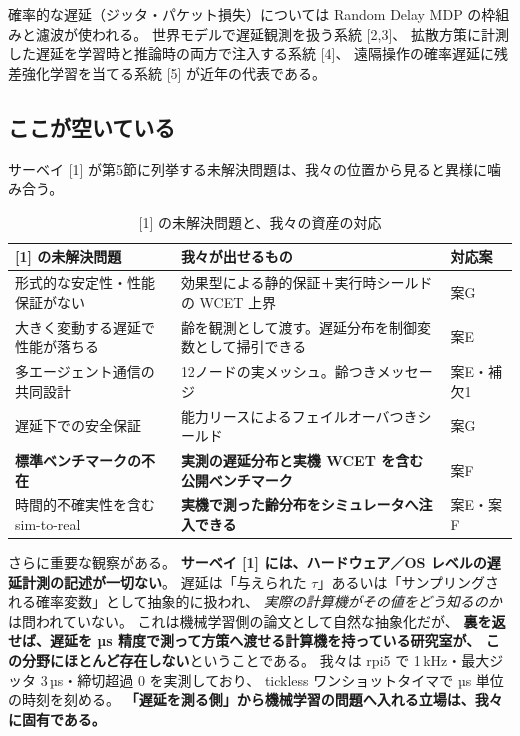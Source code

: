 \documentclass[11pt,a4paper]{article}
\newcommand{\prob}[1]{\textbf{\textcolor{red!55!black}{#1}}}
\newcommand{\keyp}[1]{\textbf{\textcolor{blue!45!black}{#1}}}
\begin{document}
\noindent
確率的な遅延（ジッタ・パケット損失）については
Random Delay MDP の枠組みと濾波が使われる。
世界モデルで遅延観測を扱う系統 [2,3]、
拡散方策に計測した遅延を学習時と推論時の両方で注入する系統 [4]、
遠隔操作の確率遅延に残差強化学習を当てる系統 [5] が近年の代表である。

\subsection{ここが空いている}

サーベイ [1] が第5節に列挙する未解決問題は、我々の位置から見ると異様に噛み合う。

\begin{table}[htbp]
\centering
\small
\caption{[1] の未解決問題と、我々の資産の対応}
\label{tab:open}
\begin{tabularx}{\textwidth}{@{}l X l@{}}
\toprule
\textbf{[1] の未解決問題} & \textbf{我々が出せるもの} & \textbf{対応案} \\
\midrule
形式的な安定性・性能保証がない & 効果型による静的保証＋実行時シールドの WCET 上界 & 案G \\
大きく変動する遅延で性能が落ちる & 齢を観測として渡す。遅延分布を制御変数として掃引できる & 案E \\
多エージェント通信の共同設計 & 12ノードの実メッシュ。齢つきメッセージ & 案E・補欠1 \\
遅延下での安全保証 & 能力リースによるフェイルオーバつきシールド & 案G \\
\prob{標準ベンチマークの不在} & \keyp{実測の遅延分布と実機 WCET を含む公開ベンチマーク} & 案F \\
時間的不確実性を含む sim-to-real & \keyp{実機で測った齢分布をシミュレータへ注入できる} & 案E・案F \\
\bottomrule
\end{tabularx}
\end{table}

\noindent
さらに重要な観察がある。
\prob{サーベイ [1] には、ハードウェア／OS レベルの遅延計測の記述が一切ない}。
遅延は「与えられた $\tau$」あるいは「サンプリングされる確率変数」として抽象的に扱われ、
\emph{実際の計算機がその値をどう知るのか}は問われていない。
これは機械学習側の論文として自然な抽象化だが、
\keyp{裏を返せば、遅延を µs 精度で測って方策へ渡せる計算機を持っている研究室が、
この分野にほとんど存在しない}ということである。
我々は rpi5 で 1\,kHz・最大ジッタ 3\,µs・締切超過 0 を実測しており、
tickless ワンショットタイマで µs 単位の時刻を刻める。
\keyp{「遅延を測る側」から機械学習の問題へ入れる立場は、我々に固有である。}
\end{document}
